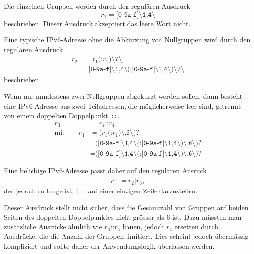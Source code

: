 \begin{loesung}
Die einzelnen Gruppen werden durch den regulären Ausdruck
\[
r_1 = \texttt{[0-9a-f]\char`\{1,4\char`\}}
\]
beschrieben.
Dieser Ausdruck akzeptiert das leere Wort nicht.

Eine typische IPv6-Adresse ohne die Abkürzung von Nullgruppen wird durch
den regulären Ausdruck 
\begin{align*}
r_2
&=
r_1\texttt{(:}r_1\texttt{)\char`\{7\char`\}}
\\
&=
\texttt{[0-9a-f]\char`\{1,4\char`\}}
\texttt{(:}
\texttt{[0-9a-f]\char`\{1,4\char`\}}
\texttt{)\char`\{7\char`\}}
\end{align*}
beschrieben.

Wenn nur mindestens zwei Nullgruppen abgekürzt werden sollen, dann
besteht eine IPv6-Adresse aus zwei Teiladressen, die möglicherweise
leer sind, getrennt von einem doppelten Doppelpunkt \texttt{::}.
\begin{align*}
r_3 &= r_4\texttt{::}r_4
\\
\text{mit}\qquad
r_4
&=
\texttt{(}r_1 \texttt{(:}r_1\texttt{)\char`\{,6\char`\}}\texttt{)?}
\\
&=
\texttt{(}
\texttt{[0-9a-f]\char`\{1,4\char`\}}
\texttt{(:}
\texttt{[0-9a-f]\char`\{1,4\char`\}}
\texttt{)\char`\{,6\char`\}}\texttt{)?}
\\
&=
\texttt{(}
\texttt{[0-9a-f]\char`\{1,4\char`\}}
\texttt{(:}
\texttt{[0-9a-f]\char`\{1,4\char`\}}
\texttt{)\char`\{,6\char`\}}\texttt{)?}
\end{align*}

Eine beliebige IPv6-Adresse passt daher auf den regulären Ausruck
\begin{align*}
r
&=
r_2\texttt{|} r_3,
\end{align*}
der jedoch zu lange ist, ihn auf einer einzigen Zeile darzustellen.

Dieser Ausdruck stellt nicht sicher, dass die Gesamtzahl von Gruppen
auf beiden Seiten des doppelten Doppelpunktes nicht grösser als $6$ ist.
Dazu müssten man zusätzliche Ausrücke ähnlich wie $r_4\texttt{::}r_4$
bauen, jedoch $r_4$ ersetzen durch Ausdrücke, die die Anzahl der Gruppen
limitiert.
Dies scheint jedoch übermässig kompliziert und sollte daher der
Anwendungslogik überlassen werden.
\end{loesung}





